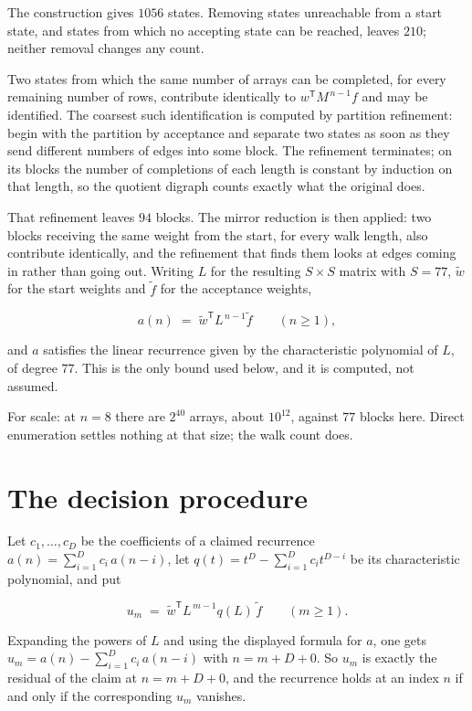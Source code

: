 \documentclass[11pt]{article}
\theoremstyle{definition}
\begin{document}
The construction gives $1056$ states. Removing states unreachable from a start state, and states from which no accepting state can be reached, leaves $210$; neither removal changes any count.

Two states from which the same number of arrays can be completed, for every remaining number of rows, contribute identically to $w^{\mathsf T}M^{\,n-1}f$ and may be identified. The coarsest such identification is computed by partition refinement: begin with the partition by acceptance and separate two states as soon as they send different numbers of edges into some block. The refinement terminates; on its blocks the number of completions of each length is constant by induction on that length, so the quotient digraph counts exactly what the original does.

That refinement leaves $94$ blocks. The mirror reduction is then applied: two blocks receiving the same weight from the start, for every walk length, also contribute identically, and the refinement that finds them looks at edges coming in rather than going out. Writing $L$ for the resulting $S \times S$ matrix with $S = 77$, $\tilde w$ for the start weights and $\tilde f$ for the acceptance weights,

\[a(n) \;=\; \tilde w^{\mathsf T} L^{\,n-1} \tilde f \qquad (n \ge 1),\]

and $a$ satisfies the linear recurrence given by the characteristic polynomial of $L$, of degree $77$. This is the only bound used below, and it is computed, not assumed.

For scale: at $n = 8$ there are $2^{40}$ arrays, about $10^{12}$, against $77$ blocks here. Direct enumeration settles nothing at that size; the walk count does.

\section{The decision procedure}

Let $c_1,\dots,c_D$ be the coefficients of a claimed recurrence $a(n) = \sum_{i=1}^{D} c_i\,a(n-i)$, let $q(t) = t^{D} - \sum_{i=1}^{D} c_i t^{D-i}$ be its characteristic polynomial, and put

\[u_m \;=\; \tilde w^{\mathsf T} L^{\,m-1} q(L)\,\tilde f \qquad (m \ge 1).\]

Expanding the powers of $L$ and using the displayed formula for $a$, one gets $u_m = a(n) - \sum_{i=1}^{D} c_i\,a(n-i)$ with $n = m + D + 0$. So $u_m$ is exactly the residual of the claim at $n = m + D + 0$, and the recurrence holds at an index $n$ if and only if the corresponding $u_m$ vanishes.
\end{document}
